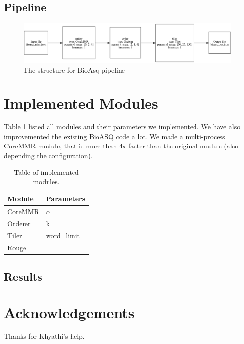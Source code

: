 \documentclass{article}
\begin{document}
    \subsection{Pipeline}

    \begin{figure}[H]
        \begin{center}
            \includegraphics[width=\textwidth]{fig/bioasq_pipeline.png}
        \end{center}
        \label{fig:bioasq_pipeline}
        \caption{The structure for BioAsq pipeline}
    \end{figure}


    \section{Implemented Modules}

        Table \ref{tbl:modules} listed all modules and their parameters we implemented.
        We have also improvemented the existing BioASQ code a lot.
        We made a multi-process CoreMMR module, that is more than 4x faster than the original module (also depending the configuration).

        \begin{table}[h]
            \centering
            \begin{tabular}{|l|l|}
                \hline
                Module  & Parameters \\ \hline
                CoreMMR & $\alpha$           \\ \hline
                Orderer &  k          \\ \hline
                Tiler   &  word\_limit          \\ \hline
                Rouge   &            \\ \hline
            \end{tabular}
            \caption{Table of implemented modules.}
            \label{tbl:modules}
        \end{table}

    \subsection{Results}


\section*{Acknowledgements}
Thanks for Khyathi's help.
\end{document}
